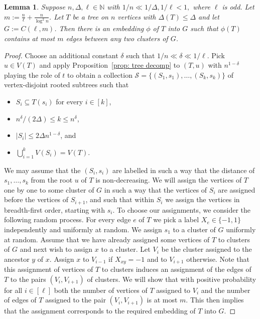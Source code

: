 \documentclass[a4paper, 11pt, reqno]{amsart}
\newtheorem{lemma}[definition]{Lemma}
\numberwithin{equation}{section}
\newcommand{\1}{{\rm 1\hspace*{-0.4ex}%
\rule{0.1ex}{1.52ex}\hspace*{0.2ex}}}
\newcommand{\N}{\mathbb N}
\newcommand{\cS}{\mathcal{S}}
\begin{document}
\begin{lemma}\label{lem: tree in a cycle}
Suppose $n,\Delta,\ell \in \N$ with $1/n\ll 1/\Delta, 1/\ell<1,$ where $\ell$ is odd. Let $m:= \frac{n}{\ell} + \frac{n}{\log^2 n}$.
Let $T$ be a tree on $n$ vertices with $\Delta(T)\leq \Delta$ and let $G:=C(\ell,m)$. 
Then there is an embedding $\phi$ of $T$ into $G$ such that $\phi(T)$ contains at most $m$ edges between any two clusters of $G$.
\end{lemma}
\begin{proof}
Choose an additional constant $\delta$ such that $1/n \ll \delta \ll 1/\ell$.
Pick $u\in V(T)$ and apply Proposition~\ref{prop: tree decomp} to $(T,u)$ with $n^{1-\delta}$ playing the role of $t$ to obtain a collection $\cS=\{(S_1,s_1),\dots, (S_{k},s_{k})\}$ of vertex-disjoint rooted subtrees such that 
\begin{itemize}
	\item $S_i\subseteq T(s_i)$ for every $i\in [k]$,
	\item $n^{\delta}/(2\Delta)\leq k\leq n^{\delta}$, 
	\item $|S_i|\leq 2\Delta n^{1-\delta}$, and
	\item $\bigcup_{i=1}^kV(S_i)=V(T)$.
\end{itemize}
We may assume that the $(S_i,s_i)$ are labelled in such a way that the distance of $s_1,\dots, s_k$ from the root $u$ of $T$ is non-decreasing. We will assign the vertices of $T$ one by one to some cluster of $G$ in such a way that the vertices of $S_i$ are assigned before the vertices of $S_{i+1}$, and such that within $S_i$ we assign the vertices in breadth-first order, starting with $s_i$. 
To choose our assignments, we consider the following random process. For every edge $e$ of $T$ we pick a label $X_e \in \{-1,1\}$ independently and uniformly at random. 
We assign $s_1$ to a cluster of $G$ uniformly at random. 
Assume that we have already assigned some vertices of $T$ to clusters of $G$ and next wish to assign $x$ to a cluster. Let $V_i$ be the cluster assigned to the ancestor $y$ of $x$. Assign $x$ to $V_{i-1}$ if $X_{xy}=-1$ and to $V_{i+1}$ otherwise. 
Note that this assignment of vertices of $T$ to clusters induces an assignment of the edges of $T$ to the pairs $(V_i,V_{i+1})$ of clusters. 
We will show that with positive probability for all $i\in [\ell]$ both the number of vertices of $T$ assigned to $V_i$ and the number of edges of $T$ assigned to the pair $(V_i,V_{i+1})$ is at most $m$. 
This then implies that the assignment corresponds to the required embedding of $T$ into $G$.


\end{proof}
\end{document}
